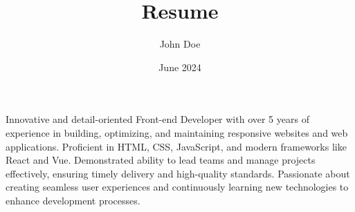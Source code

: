 \documentclass{resume}
\title{Resume}
\author{John Doe}
\date{June 2024}
\begin{document}
\begin{multicols}{3}
    \columnbreak
    \columnbreak
\end{multicols}

\begin{multicols}{2}

    \columnbreak
    \begin{spacing}{1.5}
        Innovative and detail-oriented Front-end Developer with over 5 years of experience in building, optimizing, and maintaining responsive websites and web applications. Proficient in HTML, CSS, JavaScript, and modern frameworks like React and Vue. Demonstrated ability to lead teams and manage projects effectively, ensuring timely delivery and high-quality standards. Passionate about creating seamless user experiences and continuously learning new technologies to enhance development processes.
    \end{spacing}
\end{multicols}

\vspace{1em}
\setlength{\columnsep}{1cm}
\end{document}
